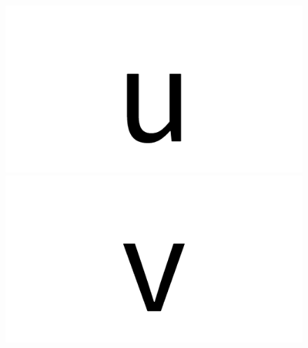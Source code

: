 \documentclass{article}
\begin{document}
\begin{figure}[H]
  \includegraphics[width=\linewidth]{u}
\endminipage\hfill
{}
  \includegraphics[width=\linewidth]{v}
\endminipage\hfill
\end{figure}
\end{document}
